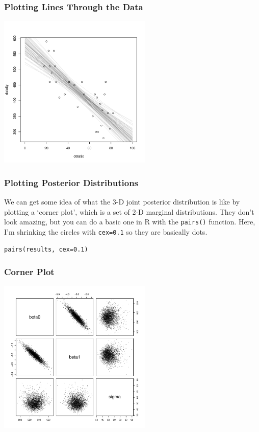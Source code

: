\documentclass{beamer}
\begin{document}
\begin{frame}
\frametitle{Plotting Lines Through the Data}
\begin{center}
\includegraphics[width=0.55\textwidth]{images/road_lines.pdf}
\end{center}
\end{frame}



\begin{frame}[fragile]
\frametitle{Plotting Posterior Distributions}
We can get some idea of what the 3-D joint posterior distribution is like
by plotting a `corner plot', which is a set of 2-D marginal distributions.
They don't look amazing, but you can do a basic one in R with the
\texttt{pairs()} function. Here, I'm shrinking the circles with
\texttt{cex=0.1} so they are basically dots.

\begin{verbatim}
pairs(results, cex=0.1)
\end{verbatim}

\end{frame}


\begin{frame}
\frametitle{Corner Plot}
\begin{center}
\includegraphics[width=0.55\textwidth]{images/road_corner.pdf}
\end{center}
\end{frame}
\end{document}

